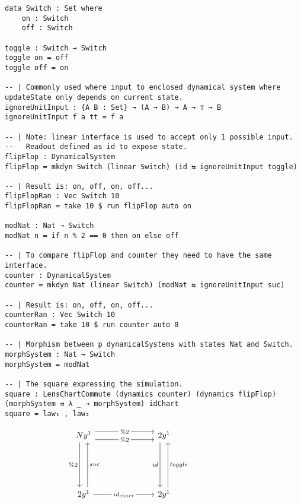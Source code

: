 \begin{verbatim}
data Switch : Set where
    on : Switch
    off : Switch

toggle : Switch → Switch
toggle on = off
toggle off = on

-- | Commonly used where input to enclosed dynamical system where updateState only depends on current state.
ignoreUnitInput : {A B : Set} → (A → B) → A → ⊤ → B
ignoreUnitInput f a tt = f a

-- | Note: linear interface is used to accept only 1 possible input.
--   Readout defined as id to expose state.
flipFlop : DynamicalSystem
flipFlop = mkdyn Switch (linear Switch) (id ⇆ ignoreUnitInput toggle)

-- | Result is: on, off, on, off...
flipFlopRan : Vec Switch 10
flipFlopRan = take 10 $ run flipFlop auto on

modNat : Nat → Switch
modNat n = if n % 2 == 0 then on else off

-- | To compare flipFlop and counter they need to have the same interface.
counter : DynamicalSystem
counter = mkdyn Nat (linear Switch) (modNat ⇆ ignoreUnitInput suc)

-- | Result is: on, off, on, off...
counterRan : Vec Switch 10
counterRan = take 10 $ run counter auto 0

-- | Morphism between p dynamicalSystems with states Nat and Switch.
morphSystem : Nat → Switch
morphSystem = modNat

-- | The square expressing the simulation.
square : LensChartCommute (dynamics counter) (dynamics flipFlop) (morphSystem ⇉ λ _ → morphSystem) idChart
square = law₁ , law₂
\end{verbatim}

\[\begin{tikzcd}
	{Ny^1} &&& {2y^1} &&& {} \\
	\\
	\\
	{2y^1} &&& {2y^1}
	\arrow["{\% 2}"', shift right=2, from=1-1, to=4-1]
	\arrow["suc"', shift right=2, from=4-1, to=1-1]
	\arrow["id"', shift right=2, from=1-4, to=4-4]
	\arrow["toggle"', shift right=2, from=4-4, to=1-4]
	\arrow["{id_{chart}}"{description}, from=4-1, to=4-4]
	\arrow["{\% 2}"{description}, shift left=2, from=1-1, to=1-4]
	\arrow["{\%2}"{description}, shift right=2, from=1-1, to=1-4]
\end{tikzcd}\]


